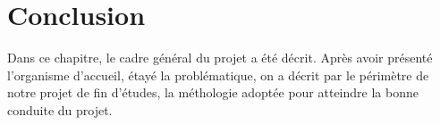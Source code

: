 \section*{Conclusion}
Dans ce chapitre, le cadre général du projet a été décrit. Après avoir présenté l’organisme d’accueil, étayé la problématique, on a décrit par le périmètre de notre projet de fin d’études, la méthologie adoptée pour atteindre la bonne conduite du projet.
